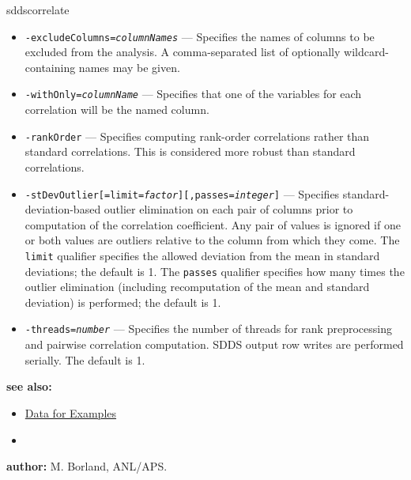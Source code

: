 \begin{sddsprog}{sddscorrelate}
\begin{itemize}
    A comma-separated list of optionally wildcard-containing names may be given.
  \item {\tt -excludeColumns={\em columnNames}} --- Specifies the names of columns to be excluded from the
    analysis. A comma-separated list of optionally wildcard-containing names may be given.
  \item {\tt -withOnly={\em columnName}} --- Specifies that one of the variables for each correlation will be
    the named column.
  \item {\tt -rankOrder} --- Specifies computing rank-order correlations rather than standard correlations.
    This is considered more robust than standard correlations.
  \item {\tt -stDevOutlier[=limit={\em factor}][,passes={\em integer}]} --- Specifies standard-deviation-based
    outlier elimination on each pair of columns prior to computation of the correlation coefficient.
    Any pair of values is ignored if one or both values are outliers relative to the column from which they come.
    The {\tt limit} qualifier specifies the allowed deviation from the mean in standard deviations; the
    default is 1. The {\tt passes} qualifier specifies how many times the outlier elimination (including
    recomputation of the mean and standard deviation) is performed; the default is 1.
  \item {\tt -threads={\em number}} --- Specifies the number of threads for rank preprocessing and pairwise
    correlation computation. SDDS output row writes are performed serially. The default is 1.
  \end{itemize}
\item \textbf{see also:}
  \begin{itemize}
  \item \hyperref[exampleData]{Data for Examples}
  \item {}
  \end{itemize}
\item \textbf{author:} M. Borland, ANL/APS.
\end{sddsprog}
